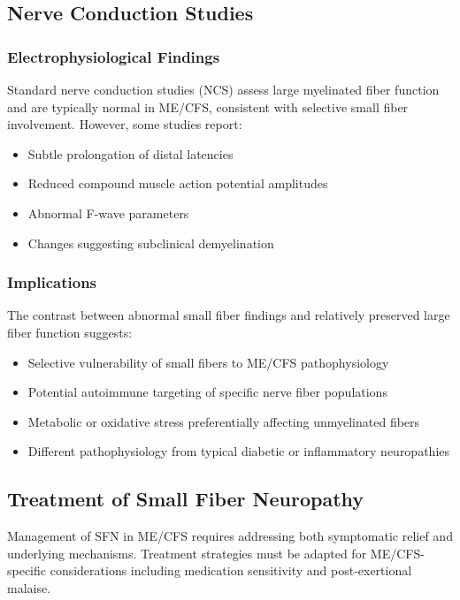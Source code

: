 \subsection{Nerve Conduction Studies}

\subsubsection{Electrophysiological Findings}

Standard nerve conduction studies (NCS) assess large myelinated fiber function and are typically normal in ME/CFS, consistent with selective small fiber involvement. However, some studies report:

\begin{itemize}
    \item Subtle prolongation of distal latencies
    \item Reduced compound muscle action potential amplitudes
    \item Abnormal F-wave parameters
    \item Changes suggesting subclinical demyelination
\end{itemize}

\subsubsection{Implications}

The contrast between abnormal small fiber findings and relatively preserved large fiber function suggests:

\begin{itemize}
    \item Selective vulnerability of small fibers to ME/CFS pathophysiology
    \item Potential autoimmune targeting of specific nerve fiber populations
    \item Metabolic or oxidative stress preferentially affecting unmyelinated fibers
    \item Different pathophysiology from typical diabetic or inflammatory neuropathies
\end{itemize}

\subsection{Treatment of Small Fiber Neuropathy}
\label{sec:sfn-treatment}

Management of SFN in ME/CFS requires addressing both symptomatic relief and underlying mechanisms. Treatment strategies must be adapted for ME/CFS-specific considerations including medication sensitivity and post-exertional malaise.

